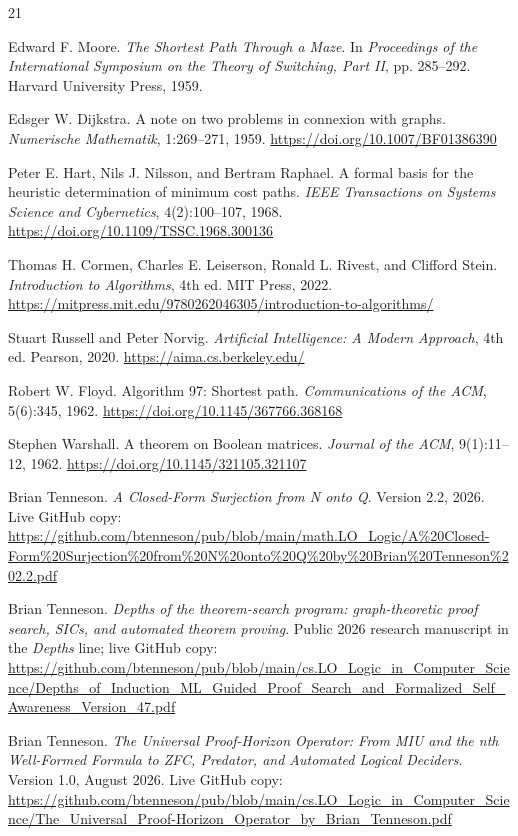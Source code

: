 \begin{thebibliography}{21}

Edward F. Moore.
\emph{The Shortest Path Through a Maze}.
In \emph{Proceedings of the International Symposium on the Theory of Switching, Part II}, pp. 285--292. Harvard University Press, 1959.

Edsger W. Dijkstra.
A note on two problems in connexion with graphs.
\emph{Numerische Mathematik}, 1:269--271, 1959.
\url{https://doi.org/10.1007/BF01386390}

Peter E. Hart, Nils J. Nilsson, and Bertram Raphael.
A formal basis for the heuristic determination of minimum cost paths.
\emph{IEEE Transactions on Systems Science and Cybernetics}, 4(2):100--107, 1968.
\url{https://doi.org/10.1109/TSSC.1968.300136}

Thomas H. Cormen, Charles E. Leiserson, Ronald L. Rivest, and Clifford Stein.
\emph{Introduction to Algorithms}, 4th ed.
MIT Press, 2022.
\url{https://mitpress.mit.edu/9780262046305/introduction-to-algorithms/}

Stuart Russell and Peter Norvig.
\emph{Artificial Intelligence: A Modern Approach}, 4th ed.
Pearson, 2020.
\url{https://aima.cs.berkeley.edu/}

Robert W. Floyd.
Algorithm 97: Shortest path.
\emph{Communications of the ACM}, 5(6):345, 1962.
\url{https://doi.org/10.1145/367766.368168}

Stephen Warshall.
A theorem on Boolean matrices.
\emph{Journal of the ACM}, 9(1):11--12, 1962.
\url{https://doi.org/10.1145/321105.321107}

Brian Tenneson.
\emph{A Closed-Form Surjection from N onto Q}.
Version 2.2, 2026. Live GitHub copy:
\url{https://github.com/btenneson/pub/blob/main/math.LO_Logic/A%20Closed-Form%20Surjection%20from%20N%20onto%20Q%20by%20Brian%20Tenneson%202.2.pdf}

Brian Tenneson.
\emph{Depths of the theorem-search program: graph-theoretic proof search, SICs, and automated theorem proving}.
Public 2026 research manuscript in the \emph{Depths} line; live GitHub copy:
\url{https://github.com/btenneson/pub/blob/main/cs.LO_Logic_in_Computer_Science/Depths_of_Induction_ML_Guided_Proof_Search_and_Formalized_Self_Awareness_Version_47.pdf}

Brian Tenneson.
\emph{The Universal Proof-Horizon Operator: From MIU and the nth Well-Formed Formula to ZFC, Predator, and Automated Logical Deciders}.
Version 1.0, August 2026. Live GitHub copy:
\url{https://github.com/btenneson/pub/blob/main/cs.LO_Logic_in_Computer_Science/The_Universal_Proof-Horizon_Operator_by_Brian_Tenneson.pdf}


\end{thebibliography}
